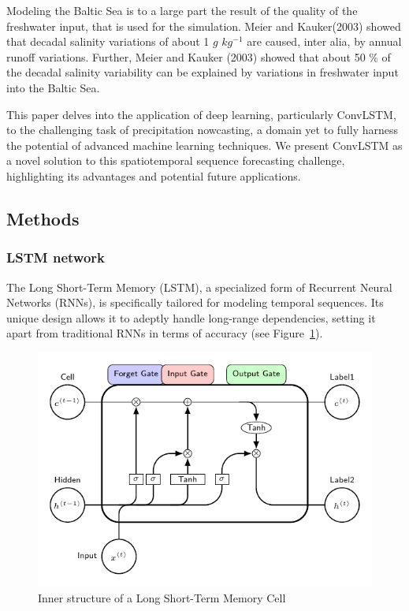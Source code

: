\documentclass[
  letterpaper,
  DIV=11,
  numbers=noendperiod]{scrartcl}
\begin{document}
Modeling the Baltic Sea is to a large part the result of the quality of
the freshwater input, that is used for the simulation. Meier and
Kauker(2003) showed that decadal salinity variations of about 1 \(g\)
\(kg^{-1}\) are caused, inter alia, by annual runoff variations.
Further, Meier and Kauker (2003) showed that about 50 \% of the decadal
salinity variability can be explained by variations in freshwater input
into the Baltic Sea.

This paper delves into the application of deep learning, particularly
ConvLSTM, to the challenging task of precipitation nowcasting, a domain
yet to fully harness the potential of advanced machine learning
techniques. We present ConvLSTM as a novel solution to this
spatiotemporal sequence forecasting challenge, highlighting its
advantages and potential future applications.

\hypertarget{methods}{%
\subsection{Methods}\label{methods}}

\hypertarget{lstm-network}{%
\subsubsection{LSTM network}\label{lstm-network}}

The Long Short-Term Memory (LSTM), a specialized form of Recurrent
Neural Networks (RNNs), is specifically tailored for modeling temporal
sequences. Its unique design allows it to adeptly handle long-range
dependencies, setting it apart from traditional RNNs in terms of
accuracy (see Figure~\ref{fig-lstm}).

\begin{figure}

{\centering \includegraphics{draw_lstm.pdf}

}

\caption{\label{fig-lstm}Inner structure of a Long Short-Term Memory
Cell}

\end{figure}
\end{document}
